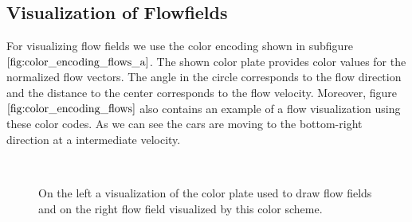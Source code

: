 \subsection{Visualization of Flowfields}
For visualizing flow fields we use the color encoding shown in subfigure $\ref{fig:color_encoding_flows_a}$. The shown color plate provides color values for the normalized flow vectors. The angle in the circle corresponds to the flow direction and the distance to the center corresponds to the flow velocity. Moreover, figure $\ref{fig:color_encoding_flows}$ also contains an example of a flow visualization using these color codes. As we can see the cars are moving to the bottom-right direction at a intermediate velocity.
\begin{figure}[H]
\begin{center}
~
\end{center}
\caption[Visual Color Encoding of Flow Fields]{On the left a visualization of the color plate used to draw flow fields and on the right flow field visualized by this color scheme.}
\label{fig:color_encoding_flows}
\end{figure}

